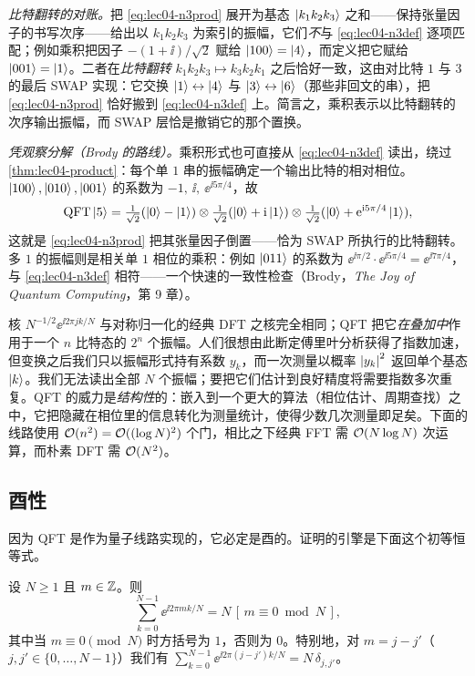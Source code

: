 \begin{example}[$n=3$ 的 QFT 与比特翻转步骤，完整版]
\emph{比特翻转的对账。}把 \cref{eq:lec04-n3prod} 展开为基态 $\ket{k_1 k_2 k_3}$ 之和——保持张量因子的书写次序——给出以 $k_1 k_2 k_3$ 为索引的振幅，它们\emph{不}与 \cref{eq:lec04-n3def} 逐项匹配；例如乘积把因子 $-(1+\ii)/\sqrt2$ 赋给 $\ket{100}=\ket{4}$，而定义把它赋给 $\ket{001}=\ket{1}$。二者在\emph{比特翻转}
$k_1 k_2 k_3\mapsto k_3 k_2 k_1$ 之后恰好一致，这由对比特 $1$ 与 $3$ 的最后 SWAP 实现：它交换 $\ket{1}\leftrightarrow\ket{4}$ 与
$\ket{3}\leftrightarrow\ket{6}$（那些非回文的串），把 \cref{eq:lec04-n3prod} 恰好搬到 \cref{eq:lec04-n3def} 上。简言之，乘积表示以比特翻转的次序输出振幅，而 SWAP 层恰是撤销它的那个置换。

\emph{凭观察分解（Brody 的路线）。}乘积形式也可直接从
\cref{eq:lec04-n3def} 读出，绕过 \cref{thm:lec04-product}：每个单 $1$ 串的振幅确定一个输出比特的相对相位。$\ket{100},\ket{010},\ket{001}$ 的系数为 $-1,\ \ii,\ \ee^{\ii 5\pi/4}$，故
\[
  \mathrm{QFT}\ket{5}=\tfrac1{\sqrt2}(\ket0-\ket1)\otimes\tfrac1{\sqrt2}(\ket0+\mathrm{i}\ket1)
  \otimes\tfrac1{\sqrt2}(\ket0+\mathrm{e}^{\mathrm{i} 5\pi/4}\ket1),
\]
这就是 \cref{eq:lec04-n3prod} 把其张量因子倒置——恰为 SWAP 所执行的比特翻转。多 $1$ 的振幅则是相关单 $1$ 相位的乘积：例如 $\ket{011}$ 的系数为
$\ee^{\ii\pi/2}\cdot\ee^{\ii 5\pi/4}=\ee^{\ii 7\pi/4}$，与 \cref{eq:lec04-n3def} 相符——一个快速的一致性检查（Brody，\emph{The Joy of Quantum Computing}，第 9 章）。
\end{example}

\begin{remark}
\label{rem:lec04-dft}
核 $N^{-1/2}\ee^{\ii 2\pi jk/N}$ 与对称归一化的经典 DFT 之核完全相同；QFT 把它\emph{在叠加中}作用于一个 $n$ 比特态的 $2^{n}$ 个振幅。人们很想由此断定傅里叶分析获得了指数加速，但变换之后我们只以振幅形式持有系数 $y_k$，而一次测量以概率 $\left\lvert y_k \right\rvert^2$ 返回单个基态 $\ket{k}$。我们无法读出全部 $N$ 个振幅；要把它们估计到良好精度将需要指数多次重复。QFT 的威力是\emph{结构性}的：嵌入到一个更大的算法（相位估计、周期查找）之中，它把隐藏在相位里的信息转化为测量统计，使得少数几次测量即足矣。下面的线路使用 $\mathcal{O}(n^2)=\mathcal{O}((\log N)^2)$ 个门，相比之下经典 FFT 需 $\mathcal{O}(N\log N)$ 次运算，而朴素 DFT 需 $\mathcal{O}(N^2)$。
\end{remark}

\subsection*{酉性}

因为 QFT 是作为量子线路实现的，它必定是酉的。证明的引擎是下面这个初等恒等式。

\begin{lemma}[几何级数恒等式]
\label{lem:lec04-geom}
设 $N\ge1$ 且 $m\in\mathbb{Z}$。则
\[
  \sum_{k=0}^{N-1}\ee^{\ii 2\pi mk/N}=N\,[\,m\equiv 0\bmod N\,],
\]
其中当 $m\equiv0\pmod N$ 时方括号为 $1$，否则为 $0$。特别地，对 $m=j-j'$（$j,j'\in\{0,\dots,N-1\}$）我们有
$\sum_{k=0}^{N-1}\ee^{\ii 2\pi(j-j')k/N}=N\,\delta_{j,j'}$。
\end{lemma}

